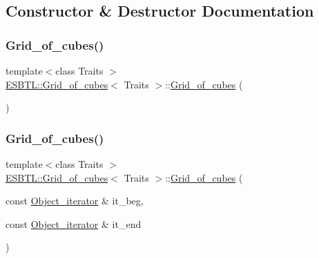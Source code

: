 \subsection{Constructor \& Destructor Documentation}
\mbox{\label{structESBTL_1_1Grid__of__cubes_af3d6b516670d62b61925dd0b4afcc99b}} 
\subsubsection{\texorpdfstring{Grid\+\_\+of\+\_\+cubes()}{Grid\_of\_cubes()}\hspace{0.1cm}{\footnotesize\ttfamily [1/2]}}
{\footnotesize\ttfamily template$<$class Traits $>$ \\
\hyperlink{structESBTL_1_1Grid__of__cubes}{E\+S\+B\+T\+L\+::\+Grid\+\_\+of\+\_\+cubes}$<$ Traits $>$\+::\hyperlink{structESBTL_1_1Grid__of__cubes}{Grid\+\_\+of\+\_\+cubes} (\begin{DoxyParamCaption}{ }\end{DoxyParamCaption})\hspace{0.3cm}{\ttfamily [inline]}}

\mbox{\label{structESBTL_1_1Grid__of__cubes_a33317f78109f4a25b351de01e0c2603f}} 
\subsubsection{\texorpdfstring{Grid\+\_\+of\+\_\+cubes()}{Grid\_of\_cubes()}\hspace{0.1cm}{\footnotesize\ttfamily [2/2]}}
{\footnotesize\ttfamily template$<$class Traits $>$ \\
\hyperlink{structESBTL_1_1Grid__of__cubes}{E\+S\+B\+T\+L\+::\+Grid\+\_\+of\+\_\+cubes}$<$ Traits $>$\+::\hyperlink{structESBTL_1_1Grid__of__cubes}{Grid\+\_\+of\+\_\+cubes} (\begin{DoxyParamCaption}\item[{const \hyperlink{structESBTL_1_1Grid__of__cubes_ae77665f05d6c7ae05c3d2d764df99193}{Object\+\_\+iterator} \&}]{it\+\_\+beg,  }\item[{const \hyperlink{structESBTL_1_1Grid__of__cubes_ae77665f05d6c7ae05c3d2d764df99193}{Object\+\_\+iterator} \&}]{it\+\_\+end }\end{DoxyParamCaption})\hspace{0.3cm}{\ttfamily [inline]}}

